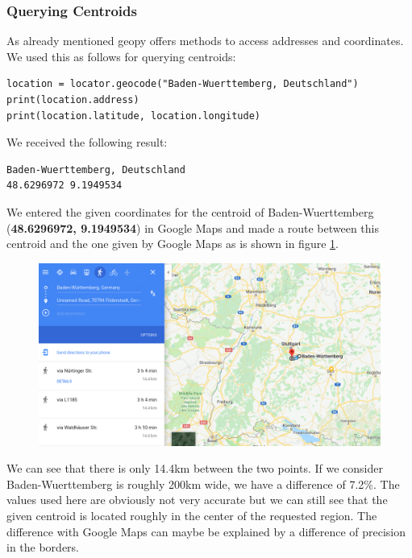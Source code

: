 \subsubsection{Querying Centroids}
As already mentioned geopy offers methods to access addresses and coordinates. We used this as follows for querying centroids:
\begin{lstlisting}[breaklines=true]
location = locator.geocode("Baden-Wuerttemberg, Deutschland")
print(location.address)
print(location.latitude, location.longitude)
\end{lstlisting}
We received the following result:
\begin{lstlisting}[language=bash,breaklines=true]
Baden-Wuerttemberg, Deutschland
48.6296972 9.1949534
\end{lstlisting}
We entered the given coordinates for the centroid of Baden-Wuerttemberg (\textbf{48.6296972, 9.1949534}) in Google Maps and made a route between this centroid and the one given by Google Maps as is shown in figure \ref{fig:centroid}.
\begin{figure}[H]
\includegraphics[width=1.0\textwidth]{img/centroid}
\label{fig:centroid}
\end{figure}
We can see that there is only 14.4km between the two points. If we consider Baden-Wuerttemberg is roughly
200km wide, we have a difference of 7.2\%.
The values used here are obviously not very accurate but we can still see that the given centroid is located roughly in the center of the requested region.
The difference with Google Maps can maybe be explained by a difference of precision in the borders.
